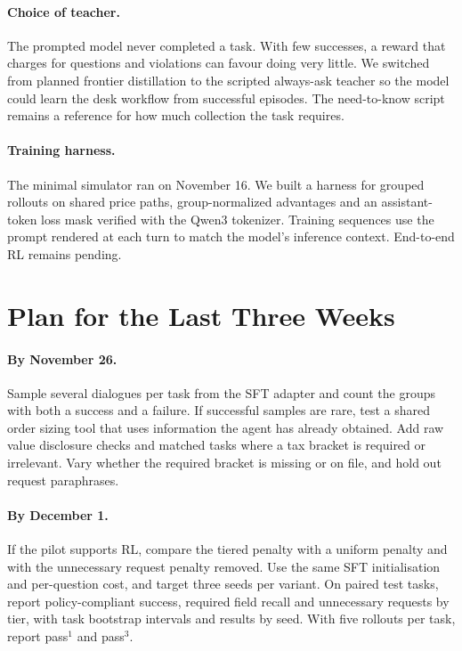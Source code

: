 \documentclass[11pt]{article}
\begin{document}
\paragraph{Choice of teacher.} The prompted model never completed a task. With few successes, a reward that charges for questions and violations can favour doing very little. We switched from planned frontier distillation to the scripted always-ask teacher so the model could learn the desk workflow from successful episodes. The need-to-know script remains a reference for how much collection the task requires.

\paragraph{Training harness.} The minimal simulator ran on November 16. We built a harness for grouped rollouts on shared price paths, group-normalized advantages and an assistant-token loss mask verified with the Qwen3 tokenizer. Training sequences use the prompt rendered at each turn to match the model's inference context. End-to-end RL remains pending.

\section{Plan for the Last Three Weeks}
\label{sec:plan}

\paragraph{By November 26.} Sample several dialogues per task from the SFT adapter and count the groups with both a success and a failure. If successful samples are rare, test a shared order sizing tool that uses information the agent has already obtained. Add raw value disclosure checks and matched tasks where a tax bracket is required or irrelevant. Vary whether the required bracket is missing or on file, and hold out request paraphrases.

\paragraph{By December 1.} If the pilot supports RL, compare the tiered penalty with a uniform penalty and with the unnecessary request penalty removed. Use the same SFT initialisation and per-question cost, and target three seeds per variant. On paired test tasks, report policy-compliant success, required field recall and unnecessary requests by tier, with task bootstrap intervals and results by seed. With five rollouts per task, report pass$^1$ and pass$^3$.
\end{document}

